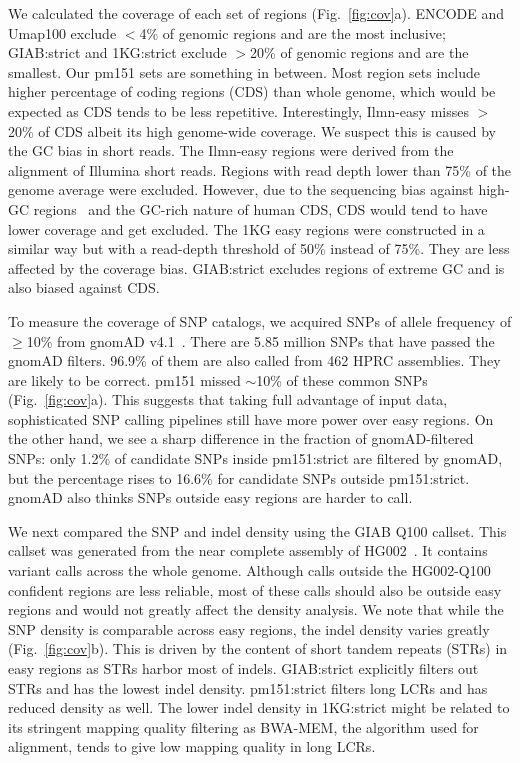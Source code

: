 \documentclass[webpdf,contemporary,large,namedate]{oup-authoring-template}%
\begin{document}
We calculated the coverage of each set of regions (Fig.~\ref{fig:cov}a).
ENCODE and Umap100 exclude $<$4\% of genomic regions and are the most inclusive;
GIAB:strict and 1KG:strict exclude $>$20\% of genomic regions and are the smallest.
Our pm151 sets are something in between.
Most region sets include higher percentage of coding regions (CDS) than whole genome, which would be expected as CDS tends to be less repetitive.
Interestingly, Ilmn-easy misses $>$20\% of CDS albeit its high genome-wide coverage.
We suspect this is caused by the GC bias in short reads.
The Ilmn-easy regions were derived from the alignment of Illumina short reads.
Regions with read depth lower than 75\% of the genome average were excluded.
However, due to the sequencing bias against high-GC regions~\citep{Benjamini:2012aa} and the GC-rich nature of human CDS,
CDS would tend to have lower coverage and get excluded.
The 1KG easy regions were constructed in a similar way but with a read-depth threshold of 50\% instead of 75\%.
They are less affected by the coverage bias.
GIAB:strict excludes regions of extreme GC and is also biased against CDS.

To measure the coverage of SNP catalogs, we acquired SNPs of allele frequency of $\ge$10\% from gnomAD v4.1~\citep{Karczewski:2020aa}.
There are 5.85 million SNPs that have passed the gnomAD filters.
96.9\% of them are also called from 462 HPRC assemblies.
They are likely to be correct.
pm151 missed $\sim$10\% of these common SNPs (Fig.~\ref{fig:cov}a).
This suggests that taking full advantage of input data,
sophisticated SNP calling pipelines still have more power over easy regions.
On the other hand, we see a sharp difference in the fraction of gnomAD-filtered SNPs:
only 1.2\% of candidate SNPs inside pm151:strict are filtered by gnomAD,
but the percentage rises to 16.6\% for candidate SNPs outside pm151:strict.
gnomAD also thinks SNPs outside easy regions are harder to call.

We next compared the SNP and indel density using the GIAB Q100 callset.
This callset was generated from the near complete assembly of HG002~\citep{Rautiainen:2023ab}.
It contains variant calls across the whole genome.
Although calls outside the HG002-Q100 confident regions are less reliable,
most of these calls should also be outside easy regions and would not greatly affect the density analysis.
We note that while the SNP density is comparable across easy regions,
the indel density varies greatly (Fig.~\ref{fig:cov}b).
This is driven by the content of short tandem repeats (STRs) in easy regions as STRs harbor most of indels.
GIAB:strict explicitly filters out STRs and has the lowest indel density.
pm151:strict filters long LCRs and has reduced density as well.
The lower indel density in 1KG:strict might be related to its stringent mapping quality filtering
as BWA-MEM, the algorithm used for alignment, tends to give low mapping quality in long LCRs.
\end{document}
